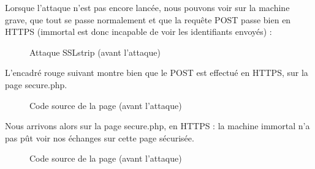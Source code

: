 Lorsque l'attaque n'est pas encore lancée, nous pouvons voir sur la machine grave, que tout se passe normalement et que la requête POST passe bien en HTTPS (immortal est donc incapable de voir les identifiants envoyés) :

\begin{figure}[H]
  \caption{Attaque SSLstrip (avant l'attaque)}
\end{figure}

L'encadré rouge suivant montre bien que le POST est effectué en HTTPS, sur la page secure.php.

\begin{figure}[H]
  \caption{Code source de la page (avant l'attaque)}
\end{figure}

Nous arrivons alors sur la page secure.php, en HTTPS : la machine immortal n'a pas pût voir nos échanges sur cette page sécurisée.

\begin{figure}[H]
  \caption{Code source de la page (avant l'attaque)}
\end{figure}

